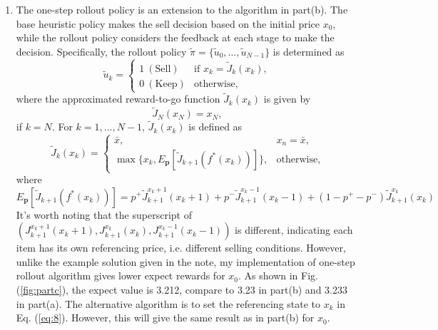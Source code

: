 \documentclass[11pt]{article}
\begin{document}
\begin{enumerate}[label=(\alph*)]
    \item
    The one-step rollout policy is an extension to the algorithm in part(b). The base heuristic policy makes the sell decision based on the initial price $x_0$, while the rollout policy considers the feedback at each stage to make the decision. Specifically, the rollout policy $\tilde \pi = \{\tilde u_0, \dots, \tilde u_{N-1}\}$ is determined as
    \[
    \tilde u_k = \begin{cases}
        1~(\text{Sell}) & \text{if } x_k = \tilde{J}_k(x_k), \\
        0~(\text{Keep}) & \text{otherwise},
    \end{cases}
    \]
    where the approximated reward-to-go function $\tilde{J}_k(x_k)$ is given by
    \[
    \tilde{J}_N(x_N) = x_N,
    \]
    if $k = N$. For $k = 1, \dots, N - 1 $, $\tilde{J}_k(x_k)$ is defined as
    \begin{equation}
    \tilde{J}_k(x_k) = 
    \begin{cases}
        \bar x, & x_n = \bar x, \\
        \max \{x_k, E_{\boldsymbol p}[\tilde{J}_{k+1}(f^*(x_k))] \}, & \text{otherwise},
    \end{cases}
    \end{equation}
    where 
    \begin{equation}\label{eq:8}
    E_{\boldsymbol p}[\tilde{J}_{k+1}(f^*(x_k))] = p^+\tilde{J}^{x_k + 1}_{k+1}(x_k + 1) + p^-\tilde{J}^{x_k - 1}_{k+1}(x_k - 1) + (1-p^+-p^-)\tilde{J}^{x_k}_{k+1}(x_k)
    \end{equation}
    It's worth noting that the superscript of $(J^{x_k + 1}_{k+1}(x_k+1), J^{x_k }_{k+1}(x_k), J^{x_k - 1}_{k+1}(x_k-1))$ is different, indicating each item has its own referencing price, i.e. different selling conditions.
    However, unlike the example solution given in the note, my implementation of one-step rollout algorithm gives lower expect rewards for $x_0$.
    As shown in Fig. (\ref{fig:partc}), the expect value is 3.212, compare to 3.23 in part(b) and 3.233 in part(a). The alternative algorithm is to set the referencing state to $x_k$ in Eq. (\ref{eq:8}). However, this will give the same result as in part(b) for $x_0$.


\end{enumerate}
\end{document}
